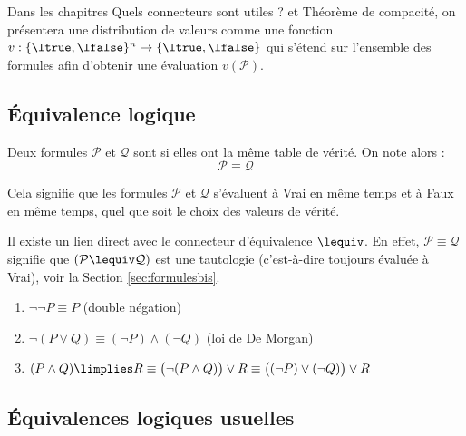 \documentclass[11pt,class=report,crop=false]{standalone}
\begin{document}
Dans les chapitres \og{}Quels connecteurs sont utiles ?\fg{} et \og{}Théorème de compacité\fg{}, on présentera une distribution de valeurs comme une fonction $v : \{ \ltrue, \lfalse \}^n \to \{ \ltrue, \lfalse \}$ qui s'étend sur l'ensemble des formules afin d'obtenir une évaluation $v(\mathcal{P})$.


\subsection{Équivalence logique}

\begin{definition}
	Deux formules $\mathcal{P}$ et $\mathcal{Q}$ sont  si elles ont la même table de vérité. On note alors :
	\[ \mathcal{P} \equiv \mathcal{Q} \]
\end{definition}
Cela signifie que les formules $\mathcal{P}$ et $\mathcal{Q}$ s'évaluent à Vrai en même temps et à Faux en même temps, quel que soit le choix des valeurs de vérité.

Il existe un lien direct avec le connecteur d'équivalence $\lequiv$. En effet, $\mathcal{P} \equiv \mathcal{Q}$ signifie que $(\mathcal{P} \lequiv \mathcal{Q})$ est une tautologie (c'est-à-dire toujours évaluée à Vrai), voir la Section \ref{sec:formulesbis}.

\begin{exemple}
	\sauteligne
	\begin{enumerate}
		\item $\lnot \lnot P \equiv P$ (double négation)
		\item $\lnot (P \lor Q) \equiv (\lnot P) \land (\lnot Q)$ (loi de De Morgan)
		\item $(P \land Q) \limplies R \equiv \big( \lnot (P \land Q)\big) \lor R \equiv \big( (\lnot P) \lor (\lnot Q) \big) \lor R$
	\end{enumerate}
\end{exemple}


\subsection{Équivalences logiques usuelles}
\end{document}
